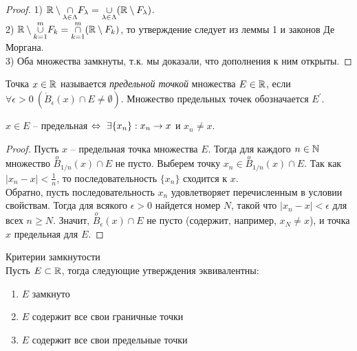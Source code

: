    \begin{proof}
        1) $\mathbb{R} \setminus \underset{\lambda \in \Lambda}{\cap} F_{\lambda} = \underset{\lambda \in \Lambda}{\cup} (\mathbb{R} \setminus F_{\lambda})$.
        \\
        2) $\mathbb{R} \setminus \overset{m}{\underset{k = 1}{\cup}} F_{k} = \overset{m}{\underset{k = 1}{\cap}} (\mathbb{R} \setminus F_{k})$, то утверждение следует из леммы 1 и законов Де Моргана.
        \\
        3) Оба множества замкнуты, т.к. мы доказали, что дополнения к ним открыты.
    \end{proof}
    
    \begin{definition}
        Точка $x \in \mathbb{R}$ называется \textit{предельной точкой} множества $E \in \mathbb{R}$, если \\
        $\forall \epsilon > 0 \ (\mathring{B}_\epsilon(x) \cap E \neq \emptyset)$. Множество предельных точек обозначается $E^{'}$.
    \end{definition}

    \begin{lemma}
        \hypertarget{tar4}{\item}$x \in E$ -- предельная $\Leftrightarrow \ \exists \{x_{n}\}: x_{n} \to x$ и $x_{n} \neq x$.
    \end{lemma}

    \begin{proof}
        Пусть $x$ -- предельная точка множества $E$. Тогда для каждого $n \in \mathbb{N}$ множество $\overset{o}{B}_{1/n}(x) \cap E$ не пусто. Выберем точку $x_{n} \in \overset{o}{B}_{1/n}(x) \cap E$. Так как $|x_{n} - x| < \frac{1}{n}$, то последовательность $\{x_{n}\}$ сходится к $x$.\\
        Обратно, пусть последовательность $x_{n}$ удовлетворяет перечисленным в условии свойствам. Тогда для всякого $\epsilon > 0$ найдется номер $N$, такой что $|x_{n} - x| < \epsilon$ для всех $n \geq N$. Значит, $\overset{o}{B}_{\epsilon}(x) \cap E$ не пусто (содержит, например, $x_{N} \neq x$), и точка $x$ предельная для $E$.
    \end{proof}
    
    \begin{theorem}{Критерии замкнутости}\\
        Пусть $E \subset \mathbb{R}$, тогда следующие утверждения эквивалентны:
        \begin{enumerate}
            \item $E$ замкнуто
            \item $E$ содержит все свои граничные точки
            \item $E$ содержит все свои предельные точки
        \end{enumerate}
    \end{theorem}


